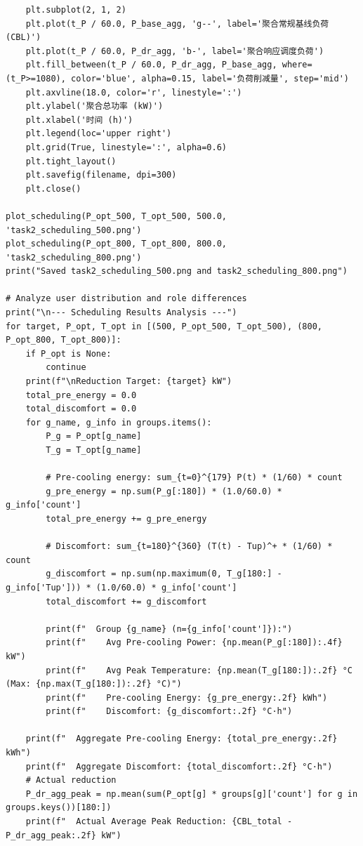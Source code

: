 \documentclass[12pt,a4paper]{article}
\begin{document}
\begin{lstlisting}
    plt.subplot(2, 1, 2)
    plt.plot(t_P / 60.0, P_base_agg, 'g--', label='聚合常规基线负荷 (CBL)')
    plt.plot(t_P / 60.0, P_dr_agg, 'b-', label='聚合响应调度负荷')
    plt.fill_between(t_P / 60.0, P_dr_agg, P_base_agg, where=(t_P>=1080), color='blue', alpha=0.15, label='负荷削减量', step='mid')
    plt.axvline(18.0, color='r', linestyle=':')
    plt.ylabel('聚合总功率 (kW)')
    plt.xlabel('时间 (h)')
    plt.legend(loc='upper right')
    plt.grid(True, linestyle=':', alpha=0.6)
    plt.tight_layout()
    plt.savefig(filename, dpi=300)
    plt.close()

plot_scheduling(P_opt_500, T_opt_500, 500.0, 'task2_scheduling_500.png')
plot_scheduling(P_opt_800, T_opt_800, 800.0, 'task2_scheduling_800.png')
print("Saved task2_scheduling_500.png and task2_scheduling_800.png")

# Analyze user distribution and role differences
print("\n--- Scheduling Results Analysis ---")
for target, P_opt, T_opt in [(500, P_opt_500, T_opt_500), (800, P_opt_800, T_opt_800)]:
    if P_opt is None:
        continue
    print(f"\nReduction Target: {target} kW")
    total_pre_energy = 0.0
    total_discomfort = 0.0
    for g_name, g_info in groups.items():
        P_g = P_opt[g_name]
        T_g = T_opt[g_name]
        
        # Pre-cooling energy: sum_{t=0}^{179} P(t) * (1/60) * count
        g_pre_energy = np.sum(P_g[:180]) * (1.0/60.0) * g_info['count']
        total_pre_energy += g_pre_energy
        
        # Discomfort: sum_{t=180}^{360} (T(t) - Tup)^+ * (1/60) * count
        g_discomfort = np.sum(np.maximum(0, T_g[180:] - g_info['Tup'])) * (1.0/60.0) * g_info['count']
        total_discomfort += g_discomfort
        
        print(f"  Group {g_name} (n={g_info['count']}):")
        print(f"    Avg Pre-cooling Power: {np.mean(P_g[:180]):.4f} kW")
        print(f"    Avg Peak Temperature: {np.mean(T_g[180:]):.2f} °C (Max: {np.max(T_g[180:]):.2f} °C)")
        print(f"    Pre-cooling Energy: {g_pre_energy:.2f} kWh")
        print(f"    Discomfort: {g_discomfort:.2f} °C·h")
        
    print(f"  Aggregate Pre-cooling Energy: {total_pre_energy:.2f} kWh")
    print(f"  Aggregate Discomfort: {total_discomfort:.2f} °C·h")
    # Actual reduction
    P_dr_agg_peak = np.mean(sum(P_opt[g] * groups[g]['count'] for g in groups.keys())[180:])
    print(f"  Actual Average Peak Reduction: {CBL_total - P_dr_agg_peak:.2f} kW")



\end{lstlisting}
\end{document}
